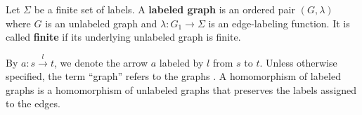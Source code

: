 \begin{definition}
    \label{def:graph}
    Let \(\Sigma\) be a finite set of labels. A \textbf{labeled graph} is an ordered pair \((G,\lambda)\) where \( G \) is an unlabeled graph and \( \lambda : G_1 \rightarrow \Sigma\) is an edge-labeling function. 
    It is called \textbf{finite} if its underlying unlabeled graph is finite.  
\end{definition}
By $a : s\overset{l}{\rightarrow} t$, we denote the arrow $a$ labeled by $l$ from $s$ to $t$. Unless otherwise specified, the term \enquote{graph} refers to the graphs .  A homomorphism of labeled graphs is a homomorphism of unlabeled graphs that preserves the labels assigned to the edges.